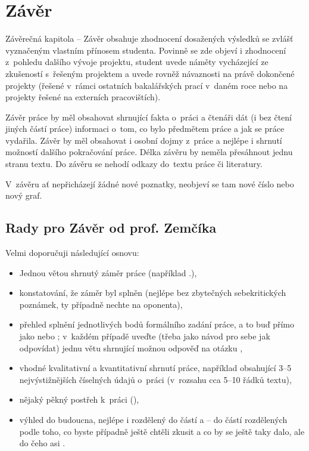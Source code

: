 \section{Závěr}
\label{zaverPrace}

Závěrečná kapitola -- Závěr obsahuje zhodnocení dosažených výsledků se zvlášť vyznačeným vlastním přínosem studenta. Povinně se zde objeví i zhodnocení z~pohledu dalšího vývoje projektu, student uvede náměty vycházející ze zkušeností s~řešeným projektem a uvede rovněž návaznosti na právě dokončené projekty (řešené v~rámci ostatních bakalářských prací v~daném roce nebo na projekty řešené na externích pracovištích). 

Závěr práce by měl obsahovat shrnující fakta o~práci a čtenáři dát (i bez čtení jiných částí práce) informaci o~tom, co bylo předmětem práce a jak se práce vydařila. Závěr by měl obsahovat i osobní dojmy z~práce a nejlépe i shrnutí možností dalšího pokračování práce. Délka závěru by neměla přesáhnout jednu stranu textu. Do závěru se nehodí odkazy do~textu práce či literatury.

V~závěru ať nepřicházejí žádné nové poznatky, neobjeví se tam nové číslo nebo nový graf.

\subsection*{Rady pro Závěr od prof. Zemčíka}

Velmi doporučuji následující osnovu:
\begin{itemize}
  \item{Jednou větou shrnutý záměr práce (například .),}
  \item{konstatování, že záměr byl splněn (nejlépe bez zbytečných sebekritických poznámek, ty případně nechte na oponenta),}
  \item{přehled splnění jednotlivých bodů formálního zadání práce, a to buď přímo jako  nebo ; v~každém případě uveďte (třeba jako návod pro sebe jak odpovídat) jednu větu shrnující možnou odpověď na otázku ,}
  \item{vhodné kvalitativní a kvantitativní shrnutí práce, například obsahující 3--5 nejvýstižnějších číselných údajů o~práci (v~rozsahu cca 5--10 řádků textu),}
  \item{nějaký pěkný postřeh k~práci (), }
  \item{výhled do budoucna, nejlépe i rozdělený do částí  a  -- do částí rozdělených podle toho, co byste případně ještě chtěli zkusit a co by se ještě taky dalo, ale do čeho asi . }
\end{itemize}

